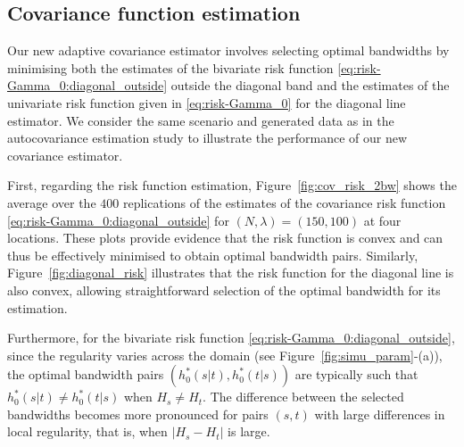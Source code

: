 \subsection{Covariance function estimation}\label{sec:emp_study:cov}
Our new adaptive covariance estimator involves selecting optimal bandwidths by minimising both the estimates of the bivariate risk function \eqref{eq:risk-Gamma_0:diagonal_outside} outside the diagonal band and the estimates of the univariate risk function given in \eqref{eq:risk-Gamma_0} for the diagonal line estimator. We consider the same scenario and generated data as in the autocovariance estimation study to illustrate the performance of our new covariance estimator.  

First, regarding the risk function estimation, Figure~\ref{fig:cov_risk_2bw} shows the average over the $400$ replications of the estimates of the covariance risk function \eqref{eq:risk-Gamma_0:diagonal_outside} for $(N, \lambda) = (150, 100)$ at four locations. These plots provide evidence that the risk function is convex and can thus be effectively minimised to obtain optimal bandwidth pairs. Similarly, Figure~\ref{fig:diagonal_risk} illustrates that the risk function for the diagonal line is also convex, allowing straightforward selection of the optimal bandwidth for its estimation.

Furthermore, for the bivariate risk function \eqref{eq:risk-Gamma_0:diagonal_outside}, since the regularity varies across the domain (see Figure~\ref{fig:simu_param}-(a)), the optimal bandwidth pairs $(h_0^*(s|t), h_0^*(t|s))$ are typically such that $h_0^*(s|t) \neq h_0^*(t|s)$ when $H_s \neq H_t$. The difference between the selected bandwidths becomes more pronounced for pairs $(s, t)$ with large differences in local regularity, that is, when $|H_s - H_t|$ is large.

